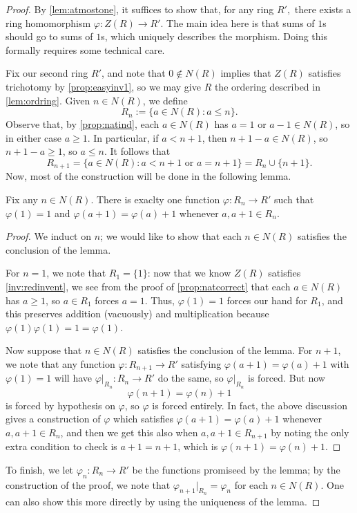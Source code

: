 \documentclass{article}
\begin{document}
\begin{proof}
	By \autoref{lem:atmostone}, it suffices to show that, for any ring $R',$ there exists a ring homomorphism $\varphi:Z(R)\to R'$. The main idea here is that sums of $1$s should go to sums of $1$s, which uniquely describes the morphism. Doing this formally requires some technical care.
	
	Fix our second ring $R'$, and note that $0\notin N(R)$ implies that $Z(R)$ satisfies trichotomy by \autoref{prop:easyinv1}, so we may give $R$ the ordering described in \autoref{lem:ordring}. Given $n\in N(R)$, we define
	\[R_n:=\{a\in N(R):a\le n\}.\]
	Observe that, by \autoref{prop:natind}, each $a\in N(R)$ has $a=1$ or $a-1\in N(R)$, so in either case $a\ge1$. In particular, if $a<n+1$, then $n+1-a\in N(R)$, so $n+1-a\ge1$, so $a\le n$. It follows that
	\[R_{n+1}=\{a\in N(R):a<n+1\text{ or }a=n+1\}=R_n\cup\{n+1\}.\]
	Now, most of the construction will be done in the following lemma.
	\begin{lemma}
		Fix any $n\in N(R)$. There is exaclty one function $\varphi:R_n\to R'$ such that $\varphi(1)=1$ and $\varphi(a+1)=\varphi(a)+1$ whenever $a,a+1\in R_n$.
	\end{lemma}
	\begin{proof}
		We induct on $n$; we would like to show that each $n\in N(R)$ satisfies the conclusion of the lemma.
		
		For $n=1$, we note that $R_1=\{1\}$: now that we know $Z(R)$ satisfies \autoref{inv:redinvent}, we see from the proof of \autoref{prop:natcorrect} that each $a\in N(R)$ has $a\ge1$, so $a\in R_1$ forces $a=1$. Thus, $\varphi(1)=1$ forces our hand for $R_1$, and this preserves addition (vacuously) and multiplication because $\varphi(1)\varphi(1)=1=\varphi(1)$.

		Now suppose that $n\in N(R)$ satisfies the conclusion of the lemma. For $n+1$, we note that any function $\varphi:R_{n+1}\to R'$ satisfying $\varphi(a+1)=\varphi(a)+1$ with $\varphi(1)=1$ will have $\varphi|_{R_n}:R_n\to R'$ do the same, so $\varphi|_{R_n}$ is forced. But now
		\[\varphi(n+1)=\varphi(n)+1\]
		is forced by hypothesis on $\varphi$, so $\varphi$ is forced entirely. In fact, the above discussion gives a construction of $\varphi$ which satisfies $\varphi(a+1)=\varphi(a)+1$ whenever $a,a+1\in R_n$, and then we get this also when $a,a+1\in R_{n+1}$ by noting the only extra condition to check is $a+1=n+1$, which is $\varphi(n+1)=\varphi(n)+1$.
	\end{proof}
	To finish, we let $\varphi_n:R_n\to R'$ be the functions promiseed by the lemma; by the construction of the proof, we note that $\varphi_{n+1}|_{R_n}=\varphi_n$ for each $n\in N(R)$. One can also show this more directly by using the uniqueness of the lemma.
	

\end{proof}
\end{document}
